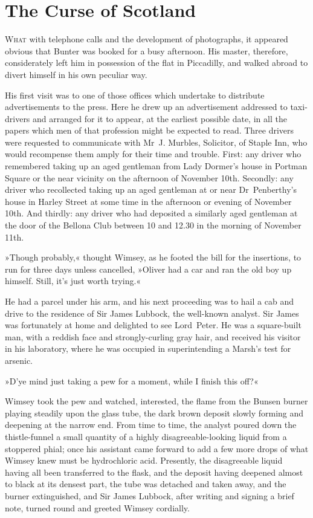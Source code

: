 \chapter{The Curse of Scotland}

\lettrine[lines=4]{W}{hat} with telephone calls and the development of photographs, it appeared obvious that Bunter was booked for a busy afternoon. His master, therefore, considerately left him in possession of the flat in Piccadilly, and walked abroad to divert himself in his own peculiar way.

His first visit was to one of those offices which undertake to distribute advertisements to the press. Here he drew up an advertisement addressed to taxi-drivers and arranged for it to appear, at the earliest possible date, in all the papers which men of that profession might be expected to read. Three drivers were requested to communicate with Mr~J\@. Murbles, Solicitor, of Staple Inn, who would recompense them amply for their time and trouble. First: any driver who remembered taking up an aged gentleman from Lady Dormer's house in Portman Square or the near vicinity on the afternoon of November 10th. Secondly: any driver who recollected taking up an aged gentleman at or near Dr~Penberthy's house in Harley Street at some time in the afternoon or evening of November 10th. And thirdly: any driver who had deposited a similarly aged gentleman at the door of the Bellona Club between 10 and 12.30 in the morning of November 11th.

»Though probably,« thought Wimsey, as he footed the bill for the insertions, to run for three days unless cancelled, »Oliver had a car and ran the old boy up himself. Still, it's just worth trying.«

He had a parcel under his arm, and his next proceeding was to hail a cab and drive to the residence of Sir James Lubbock, the well-known analyst. Sir James was fortunately at home and delighted to see Lord~Peter. He was a square-built man, with a reddish face and strongly-curling gray hair, and received his visitor in his laboratory, where he was occupied in superintending a Marsh's test for arsenic.

»D'ye mind just taking a pew for a moment, while I finish this off?«

Wimsey took the pew and watched, interested, the flame from the Bunsen burner playing steadily upon the glass tube, the dark brown deposit slowly forming and deepening at the narrow end. From time to time, the analyst poured down the thistle-funnel a small quantity of a highly disagreeable-looking liquid from a stoppered phial; once his assistant came forward to add a few more drops of what Wimsey knew must be hydrochloric acid. Presently, the disagreeable liquid having all been transferred to the flask, and the deposit having deepened almost to black at its densest part, the tube was detached and taken away, and the burner extinguished, and Sir James Lubbock, after writing and signing a brief note, turned round and greeted Wimsey cordially.

